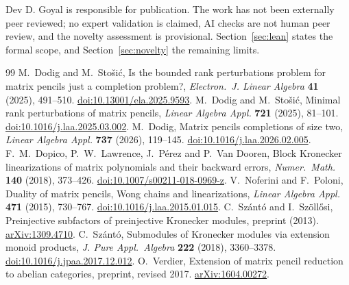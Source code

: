 \documentclass[11pt]{article}
\begin{document}
Dev D. Goyal is responsible for publication. The work has not been externally peer reviewed; no expert validation is claimed, AI checks are not human peer review, and the novelty assessment is provisional. Section~\ref{sec:lean} states the formal scope, and Section~\ref{sec:novelty} the remaining limits.

\begin{thebibliography}{99}\small
{} M.~Dodig and M.~Sto\v{s}i\'c, Is the bounded rank perturbations problem for matrix pencils just a completion problem?, \emph{Electron.\ J. Linear Algebra} \textbf{41} (2025), 491--510. \href{https://doi.org/10.13001/ela.2025.9593}{doi:10.13001/ela.2025.9593}.
 M.~Dodig and M.~Sto\v{s}i\'c, Minimal rank perturbations of matrix pencils, \emph{Linear Algebra Appl.} \textbf{721} (2025), 81--101. \href{https://doi.org/10.1016/j.laa.2025.03.002}{doi:10.1016/j.laa.2025.03.002}.
 M.~Dodig, Matrix pencils completions of size two, \emph{Linear Algebra Appl.} \textbf{737} (2026), 119--145. \href{https://doi.org/10.1016/j.laa.2026.02.005}{doi:10.1016/j.laa.2026.02.005}.
 F.~M.~Dopico, P.~W.~Lawrence, J.~P\'erez and P.~Van Dooren, Block Kronecker linearizations of matrix polynomials and their backward errors, \emph{Numer.\ Math.} \textbf{140} (2018), 373--426. \href{https://doi.org/10.1007/s00211-018-0969-z}{doi:10.1007/s00211-018-0969-z}.
 V.~Noferini and F.~Poloni, Duality of matrix pencils, Wong chains and linearizations, \emph{Linear Algebra Appl.} \textbf{471} (2015), 730--767. \href{https://doi.org/10.1016/j.laa.2015.01.015}{doi:10.1016/j.laa.2015.01.015}.
 C.~Sz\'ant\'o and I.~Sz\"oll\H{o}si, Preinjective subfactors of preinjective Kronecker modules, preprint (2013). \href{https://arxiv.org/abs/1309.4710}{arXiv:1309.4710}.
 C.~Sz\'ant\'o, Submodules of Kronecker modules via extension monoid products, \emph{J. Pure Appl.\ Algebra} \textbf{222} (2018), 3360--3378. \href{https://doi.org/10.1016/j.jpaa.2017.12.012}{doi:10.1016/j.jpaa.2017.12.012}.
 O.~Verdier, Extension of matrix pencil reduction to abelian categories, preprint, revised 2017. \href{https://arxiv.org/abs/1604.00272}{arXiv:1604.00272}.
\end{thebibliography}
\end{document}
